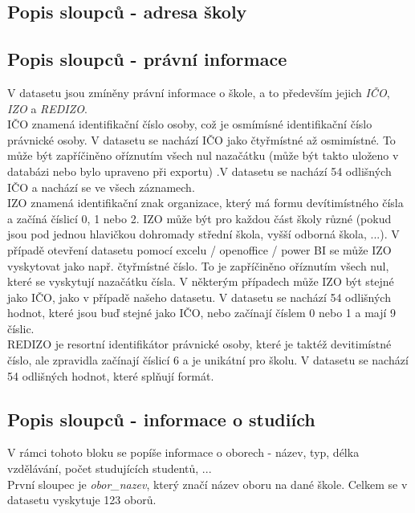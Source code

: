 \documentclass[12pt, a4paper]{article}
\begin{document}
\subsection{Popis sloupců - adresa školy}

\subsection{Popis sloupců - právní informace}
V datasetu jsou zmíněny právní informace o škole, a to především jejich \textit{IČO}, \textit{IZO} a \textit{REDIZO}.\\
IČO znamená identifikační číslo osoby, což je osmímísné identifikační číslo právnické osoby. V datasetu se nachází IČO jako čtyřmístné až osmimístné. To může být zapříčiněno oříznutím všech nul nazačátku (může být takto uloženo v databázi nebo bylo upraveno při exportu) .V datasetu se nachází 54 odlišných IČO a nachází se ve všech záznamech.\\

IZO znamená identifikační znak organizace, který má formu devítimístného čísla a začíná číslicí 0, 1 nebo 2. IZO může být pro každou část školy různé (pokud jsou pod jednou hlavičkou dohromady střední škola, vyšší odborná škola, ...). V případě otevření datasetu pomocí excelu / openoffice / power BI se může IZO vyskytovat jako např. čtyřmístné číslo. To je zapříčiněno oříznutím všech nul, které se vyskytují nazačátku čísla. V některým případech může IZO být stejné jako IČO, jako v případě našeho datasetu. V datasetu se nachází 54 odlišných hodnot, které jsou buď stejné jako IČO, nebo začínají číslem 0 nebo 1 a mají 9 číslic.\\

REDIZO je resortní identifikátor právnické osoby, které je taktéž devitimístné číslo, ale zpravidla začínají číslicí 6 a je unikátní pro školu. V datasetu se nachází 54 odlišných hodnot, které splňují formát.



\subsection{Popis sloupců - informace o studiích}
V rámci tohoto bloku se popíše informace o oborech - název, typ, délka vzdělávání, počet studujících studentů, ...\\

První sloupec je \textit{obor\_nazev}, který značí název oboru na dané škole. Celkem se v datasetu vyskytuje 123 oborů.\\
\end{document}
